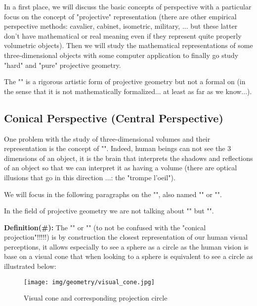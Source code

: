 	In a first place, we will discuss the basic concepts of perspective with a particular focus on the concept of "projective" representation (there are other empirical perspective methods: cavalier, cabinet, isometric, military, ... but these latter don't have mathematical or real meaning even if they represent quite properly volumetric objects). Then we will study the mathematical representations of some three-dimensional objects with some computer application to finally go study "hard" and "pure" projective geometry.
	
	\begin{tcolorbox}[title=Remark,colframe=black,arc=10pt]
	The "" is a rigorous artistic form of projective geometry but not a formal on (in the sense that it is not mathematically formalized... at least as far as we know...).
	\end{tcolorbox}
	
	\pagebreak
	\subsection{Conical Perspective (Central Perspective)}
	One problem with the study of three-dimensional volumes and their representation is the concept of "". Indeed, human beings can not see the $3$ dimensions of an object, it is the brain that interprets the shadows and reflections of an object so that we can interpret it as having a volume (there are optical illusions that go in this direction ...: the "trompe l'oeil").
	
	We will focus in the following paragraphs on the "", also named "" or "".
	
	\begin{tcolorbox}[title=Remark,colframe=black,arc=10pt]
	In the field of projective geometry we are not talking about "" but "".
	\end{tcolorbox}
	
	\textbf{Definition(\#\mydef):} The "" or "" (to not be confused with the "conical projection"!!!!!) is by construction the closest representation of our human visual perceptions, it allows especially to see a sphere as a circle as the human vision is base on a visual cone that when looking to a sphere is equivalent to see a circle as illustrated below:
	\begin{figure}[H]
		\centering
		\texttt{[image: img/geometry/visual\_cone.jpg]}
		\caption{Visual cone and corresponding projection circle}
	\end{figure}
	
